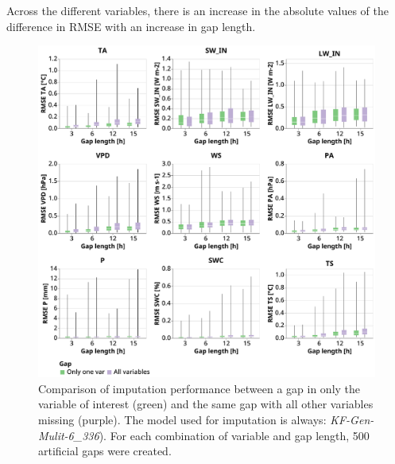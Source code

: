 \documentclass{article}
\newcommand{\imgwidth}{6in}
\begin{document}
Across the different variables, there is an increase in the absolute values of the difference in RMSE with an increase in gap length.

\begin{figure}
\centerline{\includegraphics[width=\imgwidth]{gap_single_var}}
\caption{Comparison of imputation performance between a gap in only the variable of interest (green) and the same gap with all other variables missing (purple). The model used for imputation is always: \textit{KF-Gen-Mulit-6\_336}). For each combination of variable and gap length, 500 artificial gaps were created.}
\label{fig:gap_single_var}
\end{figure}
\end{document}
